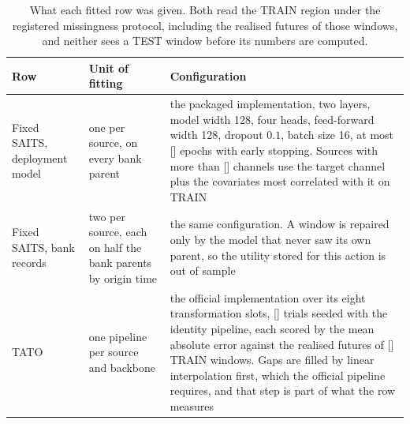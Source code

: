 \documentclass{article}
\newcommand{\ph}[1]{\textcolor{phgray}{\textsf{[\detokenize{#1}]}}}
\begin{document}
\begin{table}[h]
  \caption{What each fitted row was given. Both read the TRAIN region under the registered
  missingness protocol, including the realised futures of those windows, and neither sees a
  TEST window before its numbers are computed.}
  \label{tab:app-baselinecfg}
  \centering
  \small
  \setlength{\tabcolsep}{4pt}
\begin{tabular}{@{}p{} p{} p{}@{}}
    \toprule
    Row & Unit of fitting & Configuration \\
    \midrule
    Fixed SAITS, deployment model & one per source, on every bank parent & the packaged implementation, two layers, model width 128, four heads, feed-forward width 128, dropout $0.1$, batch size 16, at most \ph{SAITS_EPOCHS} epochs with early stopping. Sources with more than \ph{SAITS_MAXCH} channels use the target channel plus the covariates most correlated with it on TRAIN \\
    Fixed SAITS, bank records & two per source, each on half the bank parents by origin time & the same configuration. A window is repaired only by the model that never saw its own parent, so the utility stored for this action is out of sample \\
    TATO & one pipeline per source and backbone & the official implementation over its eight transformation slots, \ph{TATO_TRIALS} trials seeded with the identity pipeline, each scored by the mean absolute error against the realised futures of \ph{TATO_WINDOWS} TRAIN windows. Gaps are filled by linear interpolation first, which the official pipeline requires, and that step is part of what the row measures \\
    \bottomrule
  \end{tabular}
\end{table}
\end{document}
